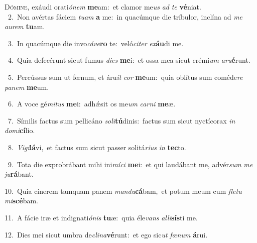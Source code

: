 \lettrine{\initial\textcolor{\initialcolor}{D}}{ómine,} exáudi orati\-\textit{ó}\-\textit{nem} \textbf{me}\-am:~\star et clamor me\textit{us} \textit{ad} \textit{te} \textbf{vé}\-niat.\\
{\numbfont\textcolor{\numbcolor}{~2.}}~Non avértas fáciem \textit{tu}\-\textit{am} \textbf{a} me:~\star in quacúmque die tríbulor, inclína ad \textit{me} \textit{au}\-\textit{rem} \textbf{tu}\-am.\par
{\numbfont\textcolor{\numbcolor}{~3.}}~In quacúmque die invo\-\textit{cá}\-\textit{ve}\textbf{ro} te:~\star veló\-\textit{ci}\-\textit{ter} \textit{ex}\-\textbf{áu}di me.\par
{\numbfont\textcolor{\numbcolor}{~4.}}~Quia defecérunt sicut fumus \textit{di}\-\textit{es} \textbf{me}\-i:~\star et ossa mea sicut crémi\textit{um} \textit{a}\-\textit{ru}\textbf{é}runt.\par
{\numbfont\textcolor{\numbcolor}{~5.}}~Percússus sum ut fœnum, et áru\textit{it} \textit{cor} \textbf{me}\-um:~\star quia oblítus sum coméde\textit{re} \textit{pa}\-\textit{nem} \textbf{me}\-um.\par
{\numbfont\textcolor{\numbcolor}{~6.}}~A voce gé\-\textit{mi}\-\textit{tus} \textbf{me}\-i:~\star adhǽsit os me\textit{um} \textit{car}\-\textit{ni} \textbf{me}\-æ.\par
{\numbfont\textcolor{\numbcolor}{~7.}}~Símilis factus sum pellicáno \textit{so}\-\textit{li}\textbf{tú}dinis:~\star factus sum sicut nyctícorax \textit{in} \textit{do}\-\textit{mi}\textbf{cí}lio.\par
{\numbfont\textcolor{\numbcolor}{~8.}}~\-\textit{Vi}\-\textit{gi}\textbf{lá}vi,~\star et factus sum sicut passer solitá\-\textit{ri}\-\textit{us} \textit{in} \textbf{tec}\-to.\par
{\numbfont\textcolor{\numbcolor}{~9.}}~Tota die exprobrábant mihi ini\-\textit{mí}\-\textit{ci} \textbf{me}\-i:~\star et qui laudábant me, advér\textit{sum} \textit{me} \textit{ju}\-\textbf{rá}bant.\par
{\numbfont\textcolor{\numbcolor}{10.}}~Quia cínerem tamquam panem \textit{man}\-\textit{du}\textbf{cá}bam,~\star et potum meum cum \textit{fle}\-\textit{tu} \textit{mi}\-\textbf{scé}bam.\par
{\numbfont\textcolor{\numbcolor}{11.}}~A fácie iræ et indignati\-\textit{ó}\-\textit{nis} \textbf{tu}\-æ:~\star quia éle\textit{vans} \textit{al}\-\textit{li}\textbf{sís}ti me.\par
{\numbfont\textcolor{\numbcolor}{12.}}~Dies mei sicut umbra de\-\textit{cli}\-\textit{na}\textbf{vé}runt:~\star et ego sic\textit{ut} \textit{fœ}\-\textit{num} \textbf{á}\-rui.\par
